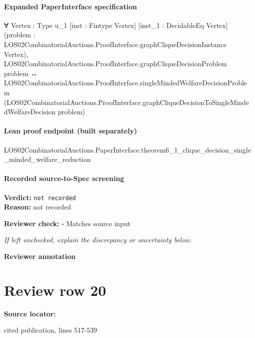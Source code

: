 \documentclass[10pt]{article}
\newcommand{\reviewerbox}{%
  \par\noindent\fbox{\parbox{0.96\linewidth}{\rule{0pt}{0.38in}}}\par
}
\newcommand{\reviewmatch}[1]{%
  \par\noindent\textbf{Reviewer check:} $\square$\; #1\par
  \noindent\emph{If left unchecked, explain the discrepancy or uncertainty below.}\par
}
\begin{document}
\paragraph{Expanded PaperInterface specification}
\begin{ReviewVerbatim}
∀ {Vertex : Type u_1} [inst : Fintype Vertex] [inst_1 : DecidableEq Vertex]
  (problem : LOS02CombinatorialAuctions.ProofInterface.graphCliqueDecisionInstance Vertex),
  LOS02CombinatorialAuctions.ProofInterface.graphCliqueDecisionProblem problem ↔
    LOS02CombinatorialAuctions.ProofInterface.singleMindedWelfareDecisionProblem
      (LOS02CombinatorialAuctions.ProofInterface.graphCliqueDecisionToSingleMindedWelfareDecision problem)
\end{ReviewVerbatim}

\paragraph{Lean proof endpoint (built separately)}\begin{ReviewVerbatim}
LOS02CombinatorialAuctions.PaperInterface.theorem6_1_clique_decision_single_minded_welfare_reduction
\end{ReviewVerbatim}

\paragraph{Recorded source-to-Spec screening}
\textbf{Verdict:} \texttt{not recorded}
\\
\textbf{Reason:} not recorded
\reviewmatch{Matches source input}
\noindent\textbf{Reviewer annotation}\par
\reviewerbox
\clearpage
\hypertarget{source-claim-6020eb38d0e63438}{}
\section*{Review row 20}
\textbf{Source locator:} {\footnotesize\raggedright cited publication, lines 517-\allowbreak{}539\par}
\end{document}
